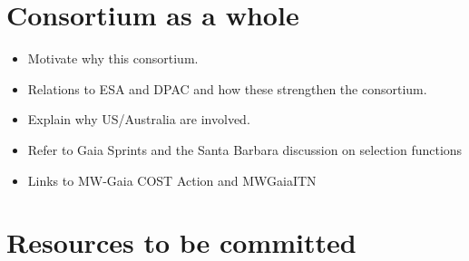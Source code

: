 \section{Consortium as a whole}
\label{sec:consortium}

\begin{itemize}
    \item Motivate why this consortium.
    \item Relations to ESA and DPAC and how these strengthen the consortium.
    \item Explain why US/Australia are involved.
    \item Refer to Gaia Sprints and the Santa Barbara discussion on selection functions
    \item Links to MW-Gaia COST Action and MWGaiaITN
\end{itemize}

\section{Resources to be committed}
\label{sec:resources}

\makesummaryofefforttable


\makecoststable

